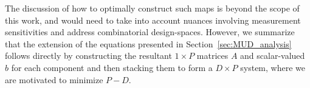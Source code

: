 The discussion of how to optimally construct such maps is beyond the scope of this work, and would need to take into account nuances involving measurement sensitivities and address combinatorial design-spaces.
However, we summarize that the extension of the equations presented in Section~\ref{sec:MUD_analysis} follows directly by constructing the resultant $1\times P$ matrices $A$ and scalar-valued $b$ for each component and then stacking them to form a $D\times P$ system, where we are motivated to minimize $P-D$.


%
%
%


